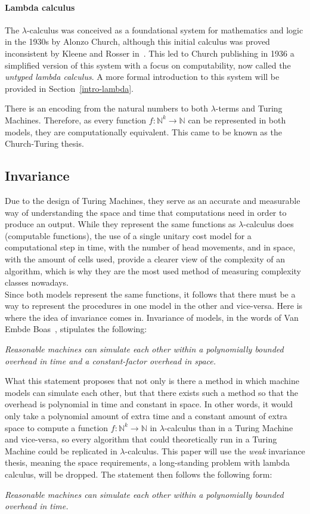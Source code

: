 \documentclass[11pt]{article}
\begin{document}
\paragraph{Lambda calculus}
The $\lambda$-calculus was conceived as a foundational system for mathematics and logic in the 1930s by Alonzo Church, although this initial calculus was proved inconsistent by Kleene and Rosser in~\cite{rosser-kleene-inconsistency}. This led to Church publishing in 1936 a simplified version of this system with a focus on computability, now called the \textit{untyped lambda calculus}. A more formal introduction to this system will be provided in Section~\ref{intro-lambda}.

There is an encoding from the natural numbers to both $\lambda$-terms and Turing Machines. Therefore, as every function $f : \mathbb{N}^k \rightarrow \mathbb{N}$ can be represented in both models, they are computationally equivalent. This came to be known as the Church-Turing thesis.
\subsection{Invariance}
Due to the design of Turing Machines, they serve as an accurate and measurable way of understanding the space and time that computations need in order to produce an output. While they represent the same functions as $\lambda$-calculus does (computable functions), the use of a single unitary cost model for a computational step in time, with the number of head movements, and in space, with the amount of cells used, provide a clearer view of the complexity of an algorithm, which is why they are the most used method of measuring complexity classes nowadays. \\
Since both models represent the same functions, it follows that there must be a way to represent the procedures in one model in the other and vice-versa. Here is where the idea of invariance comes in.
Invariance of models, in the words of Van Embde Boas~\cite{machine-models}, stipulates the following:
\begin{center}
 \textit{Reasonable machines can simulate each other within a polynomially
bounded overhead in time and a constant-factor overhead in space.}
\end{center}
What this statement proposes that not only is there a method in which machine models can simulate each other, but that there exists such a method so that the overhead is polynomial in time and constant in space. In other words, it would only take a polynomial amount of extra time and a constant amount of extra space to compute a function $f : \mathbb{N}^k \rightarrow \mathbb{N}$ in $\lambda$-calculus than in a Turing Machine and vice-versa, so every algorithm that could theoretically run in a Turing Machine could be replicated in $\lambda$-calculus.
This paper will use the \textit{weak} invariance thesis, meaning the space requirements, a long-standing problem with lambda calculus, will be dropped. The statement then follows the following form:
\begin{center}
 \textit{Reasonable machines can simulate each other within a polynomially
bounded overhead in time.}
\end{center}
\end{document}

